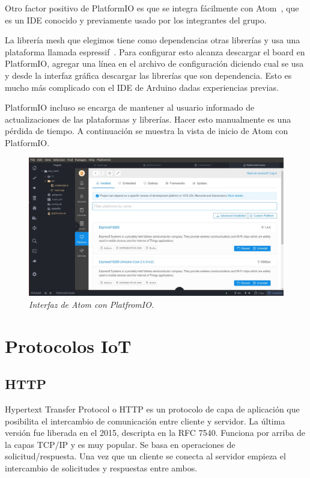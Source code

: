 Otro factor positivo de PlatformIO es que se integra fácilmente con Atom~\cite{Atom}, que es un IDE conocido y previamente usado por los integrantes del grupo.

La librería mesh que elegimos tiene como dependencias otras librerías y usa una plataforma llamada espressif~\cite{espressif-platformio}. Para configurar esto alcanza descargar el board en PlatformIO, agregar una línea en el archivo de configuración diciendo cual se usa y desde la interfaz gráfica descargar las librerías que son dependencia. Esto es mucho más complicado con el IDE de Arduino dadas experiencias previas.

PlatformIO incluso se encarga de mantener al usuario informado de actualizaciones de las plataformas y librerías. Hacer esto manualmente es una pérdida de tiempo. A continuación se muestra la vista de inicio de Atom con PlatformIO.~


\begin{figure}[h!]
  \centering
  \includegraphics[width=\textwidth, keepaspectratio]{images/platformio}
  \caption{\textit{Interfaz de Atom con PlatfromIO.}}
  \label{fig:atom-plat}
\end{figure}

\section{Protocolos IoT} \label{sec:protocolos}

\subsection{HTTP}

Hypertext Transfer Protocol o HTTP es un protocolo de capa de aplicación que posibilita el intercambio de comunicación entre cliente y servidor. La última versión fue liberada en el 2015,  descripta en la RFC 7540. Funciona por arriba de la capas TCP/IP y es muy popular. Se basa en operaciones de solicitud/respuesta. Una vez que un cliente se conecta al servidor empieza el intercambio de solicitudes y respuestas entre ambos.

